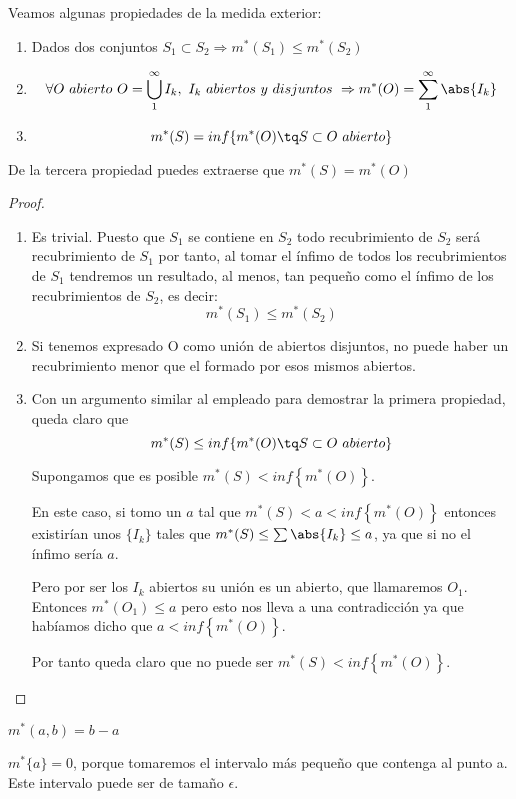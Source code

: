 \documentclass{apuntes}
\begin{document}
Veamos algunas propiedades de la medida exterior:
\begin{enumerate}
\item Dados dos conjuntos $S_1 \subset S_2 \Rightarrow m^*(S_1) \leq m^*(S_2)$
\item \[\forall O \ abierto \ O = \bigcup_{1}^{\infty}I_k, \ I_k \ abiertos \ y \ disjuntos \ \Rightarrow m^*(O)=\sum_{1}^{\infty}\abs{I_k}\]
\item \[m^*(S) = inf \lbrace m^*(O)\tq S \subset O \ abierto \rbrace\]
\end{enumerate}

De la tercera propiedad puedes extraerse que $ m^*(S) = m^*(O)$
\begin{proof}
\begin{enumerate}
\item Es trivial. Puesto que $S_1$ se contiene en $S_2$ todo recubrimiento de $S_2$ será recubrimiento de $S_1$ por tanto, al tomar el ínfimo de todos los recubrimientos de $S_1$ tendremos un resultado, al menos, tan pequeño como el ínfimo de los recubrimientos de $S_2$, es decir:
\[m^*(S_1) \leq m^*(S_2)\]
\item Si tenemos expresado O como unión de abiertos disjuntos, no puede haber un recubrimiento menor que el formado por esos mismos abiertos.
\item Con un argumento similar al empleado para demostrar la primera propiedad, queda claro que
\[m^*(S) \leq inf \lbrace m^*(O)\tq S \subset O \ abierto \rbrace \]

Supongamos que es posible $m^*(S) < inf\left\{m^*(O)\right\}$.

En este caso, si tomo un $a$ tal que $ m^*(S) < a < inf\left\{ m^*(O)\right\}$ entonces existirían unos $\lbrace I_k\rbrace$ tales que $m^*(S) \leq \sum \abs{I_k} \leq a$, ya que si no el ínfimo sería $a$.

Pero por ser los $I_k$ abiertos su unión es un abierto, que llamaremos $O_1$. Entonces $m^*(O_1) \leq a$ pero esto nos lleva a una contradicción ya que habíamos dicho que $a < inf\left\{m^*(O)\right\}$.

Por tanto queda claro que no puede ser $m^*(S) < inf\left\{m^*(O)\right\}$.
\end{enumerate}
\end{proof}

\begin{example}
	$m^*(a,b) = b - a$
\end{example}

\begin{example}
	$m^*\{a\} = 0$, porque tomaremos el intervalo más pequeño que contenga al punto a. Este intervalo puede ser de tamaño $\epsilon$.
\end{example}
\end{document}
